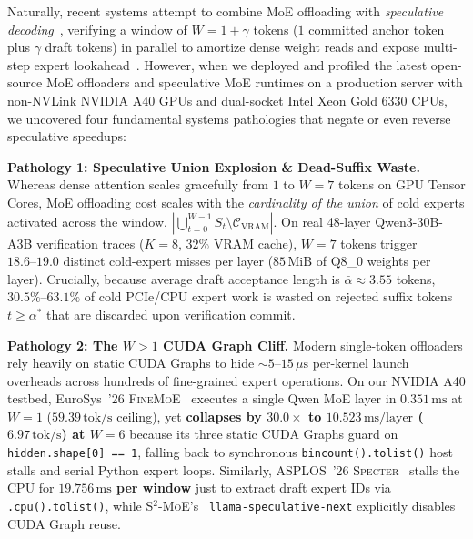 \documentclass[10pt,twocolumn]{article}
\theoremstyle{definition}
\begin{document}
Naturally, recent systems attempt to combine MoE offloading with \emph{speculative decoding}~\cite{leviathan2023speculative,chen2023accelerating,miao2024specinfer}, verifying a window of $W = 1 + \gamma$ tokens ($1$ committed anchor token plus $\gamma$ draft tokens) in parallel to amortize dense weight reads and expose multi-step expert lookahead~\cite{specter2026,moespec2026,s2moe2026}. However, when we deployed and profiled the latest open-source MoE offloaders and speculative MoE runtimes on a production server with non-NVLink NVIDIA A40 GPUs and dual-socket Intel Xeon Gold 6330 CPUs, we uncovered four fundamental systems pathologies that negate or even reverse speculative speedups:

\vspace{2pt}
\noindent\textbf{Pathology 1: Speculative Union Explosion \& Dead-Suffix Waste.}
Whereas dense attention scales gracefully from $1$ to $W=7$ tokens on GPU Tensor Cores, MoE offloading cost scales with the \emph{cardinality of the union} of cold experts activated across the window, $|\bigcup_{t=0}^{W-1} S_t \setminus \mathcal{C}_{\text{VRAM}}|$. On real 48-layer Qwen3-30B-A3B verification traces ($K=8$, $32\%$ VRAM cache), $W=7$ tokens trigger $18.6\text{--}19.0$ distinct cold-expert misses per layer ($85\,\text{MiB}$ of Q8\_0 weights per layer). Crucially, because average draft acceptance length is $\bar{\alpha} \approx 3.55$ tokens, $30.5\%\text{--}63.1\%$ of cold PCIe/CPU expert work is wasted on rejected suffix tokens $t \ge \alpha^*$ that are discarded upon verification commit.

\vspace{2pt}
\noindent\textbf{Pathology 2: The $W > 1$ CUDA Graph Cliff.}
Modern single-token offloaders rely heavily on static CUDA Graphs to hide $\sim\!5\text{--}15\,\mu\text{s}$ per-kernel launch overheads across hundreds of fine-grained expert operations. On our NVIDIA A40 testbed, EuroSys~'26 \textsc{FineMoE}~\cite{finemoe2026} executes a single Qwen MoE layer in $0.351\,\text{ms}$ at $W=1$ ($59.39\,\text{tok/s}$ ceiling), yet \textbf{collapses by $30.0\times$ to $10.523\,\text{ms/layer}$ ($6.97\,\text{tok/s}$) at $W=6$} because its three static CUDA Graphs guard on \texttt{hidden.shape[0] == 1}, falling back to synchronous \texttt{bincount().tolist()} host stalls and serial Python expert loops. Similarly, ASPLOS~'26 \textsc{Specter}~\cite{specter2026} stalls the CPU for \textbf{$19.756\,\text{ms}$ per window} just to extract draft expert IDs via \texttt{.cpu().tolist()}, while \textsc{S$^2$-MoE}'s~\cite{s2moe2026} \texttt{llama-speculative-next} explicitly disables CUDA Graph reuse.
\end{document}
